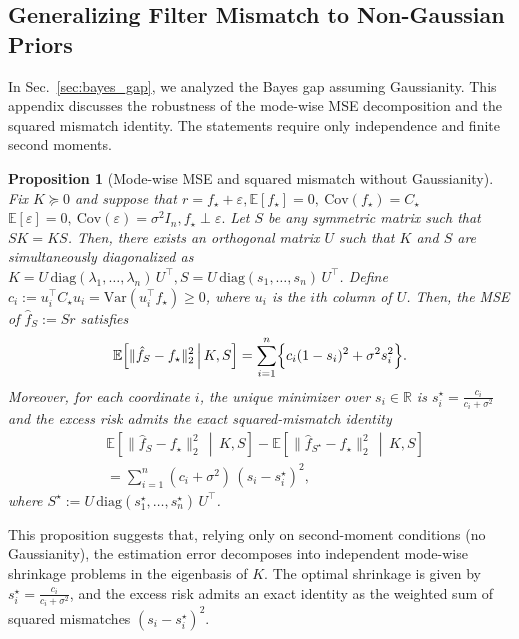\documentclass{article}
\theoremstyle{plain}
\newtheorem{proposition}[theorem]{Proposition}
\theoremstyle{definition}
\theoremstyle{remark}
\begin{document}
\subsection{Generalizing Filter Mismatch to Non-Gaussian Priors}
\label{app:second_moment_spectral}

In Sec.~\ref{sec:bayes_gap}, we analyzed the Bayes gap assuming Gaussianity.
This appendix discusses the robustness of the mode-wise MSE decomposition and the squared mismatch identity. The statements require only independence and finite second moments.

\begin{proposition}[Mode-wise MSE and squared mismatch without Gaussianity]
\label{prop:second_moment_mismatch}
Fix $K\succeq 0$ and suppose that $r = f_\star + \varepsilon,
\mathbb E[f_\star]=0,\ \mathrm{Cov}(f_\star)=C_\star\ 
$ $\mathbb E[\varepsilon]=0,\ \mathrm{Cov}(\varepsilon)=\sigma^2 I_n,
f_\star \perp \varepsilon.$ Let $S$ be any symmetric matrix such that $SK=KS$. Then, there exists an orthogonal matrix $U$ such that $K$ and $S$ are simultaneously diagonalized as $K = U\,\mathrm{diag}(\lambda_1,\dots,\lambda_n)\,U^\top, S = U\,\mathrm{diag}(s_1,\dots,s_n)\,U^\top$. Define $c_i:=u_i^\top C_\star u_i=\mathrm{Var}(u_i^\top f_\star)\ge 0$, where $u_i$ is the $i$th column of $U$. Then, the MSE of $\hat f_S:=Sr$ satisfies
\begin{equation}
    \mathbb E\!\left[\|\hat f_S-f_\star\|_2^2 \,\middle|\, K,S\right]
    = \sum_{i=1}^n\Bigl\{c_i(1-s_i)^2+\sigma^2 s_i^2\Bigr\}.
\label{eq:second_moment_mse}
\end{equation}
Moreover, for each coordinate $i$, the unique minimizer over $s_i\in\mathbb R$ is $s_i^\star = \frac{c_i}{c_i+\sigma^2}$ and the excess risk admits the exact squared-mismatch identity
\begin{align}
   &\mathbb E\!\left[\|\hat f_S-f_\star\|_2^2 \,\middle|\, K,S\right] -
   \mathbb E\!\left[\|\hat f_{S^\star}-f_\star\|_2^2 \,\middle|\, K,S\right] \\
   &= \sum_{i=1}^n (c_i+\sigma^2)\,(s_i-s_i^\star)^2,
\label{eq:second_moment_mismatch}
\end{align}
where $S^\star:=U\,\mathrm{diag}(s_1^\star,\dots,s_n^\star)\,U^\top$.
\end{proposition}

This proposition suggests that, relying only on second-moment conditions (no Gaussianity), the estimation error decomposes into independent mode-wise shrinkage problems in the eigenbasis of $K$. The optimal shrinkage is given by $s_i^\star = \frac{c_i}{c_i + \sigma^2}$, and the excess risk admits an exact identity as the weighted sum of squared mismatches $(s_i - s_i^\star)^2$.
\end{document}
